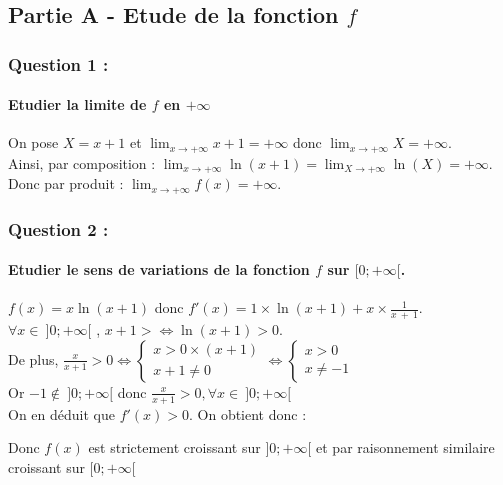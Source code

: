 \documentclass[a4paper, 12pt]{article}
\begin{document}
{}
\subsection*{Partie A - Etude de la fonction $f$}

{}
\subsubsection*{Question 1 :}
\paragraph*{Etudier la limite de $f$ en $+\infty$\\[5mm]}

On pose $X = x + 1$ et $\displaystyle \lim_{x \to +\infty}x+1=+\infty$ donc $\displaystyle \lim_{x \to +\infty} X = +\infty$.
\\[3mm]
Ainsi, par composition : $\displaystyle \lim_{x \to +\infty}\ln{\left(x+1\right)} = \displaystyle \lim_{X \to +\infty} \ln{\left(X\right)} = +\infty$.
\\[3mm]
Donc par produit : $\displaystyle \lim_{x \to +\infty} f(x) = +\infty$.

{}
\subsubsection*{Question 2 :}
\paragraph*{Etudier le sens de variations de la fonction $f$ sur $[0;+\infty[$. \\[5mm]}

$f(x) = x\ln{\left(x + 1 \right)}$ donc $f'(x) = 1 \times \ln{\left(x + 1 \right)} + x \times \frac{1}{x\ +\ 1}$.
\\[2mm]
$\forall x \in \ ]0;+\infty[$ , $x+1 > \iff \ln{\left(x + 1 \right)} > 0$.
\\[2mm]
De plus, $\frac{x}{x+1}> 0 \iff \begin{cases} x > 0\times (x+1) \\ x+1 \neq 0 \end{cases} \iff \begin{cases} x > 0 \\ x \neq -1 \end{cases}$
\\[2mm]
Or $-1\notin \ ]0;+\infty[$ donc $\frac{x}{x+1} > 0, \forall x \in \ ]0;+\infty[$ 
\\[2mm]
On en déduit que $f'(x)> 0$. On obtient donc :
\begin{center}
\end{center}
Donc $f(x)$ est strictement croissant sur $ ]0;+\infty[$ et par raisonnement similaire croissant sur $[0;+\infty[$
\end{document}
